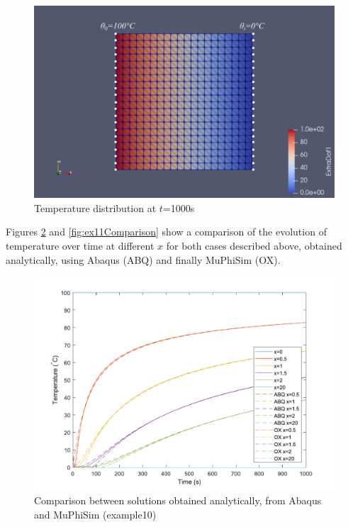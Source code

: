 \documentclass[oneside,11pt,times]{book}
\begin{document}
\begin{figure}[H]
    \centering
    \includegraphics[width=0.8\linewidth]{imgs/Examples/ex11.pdf}
    \caption{Temperature distribution at $t$=1000s}
    \label{fig:ex11t1000}
\end{figure}

Figures \ref{fig:ex10Comparison} and \ref{fig:ex11Comparison} show a comparison of the evolution of temperature over time at different $x$ for both cases described above, obtained analytically, using Abaqus (ABQ) and finally MuPhiSim (OX).

\begin{figure}[h!]
    \centering
    \includegraphics[width=0.6\linewidth]{imgs/Examples/Comparison-ex10.pdf}
    \caption{Comparison between solutions obtained analytically, from Abaqus and MuPhiSim (example10)}
    \label{fig:ex10Comparison}
\end{figure}
\end{document}
